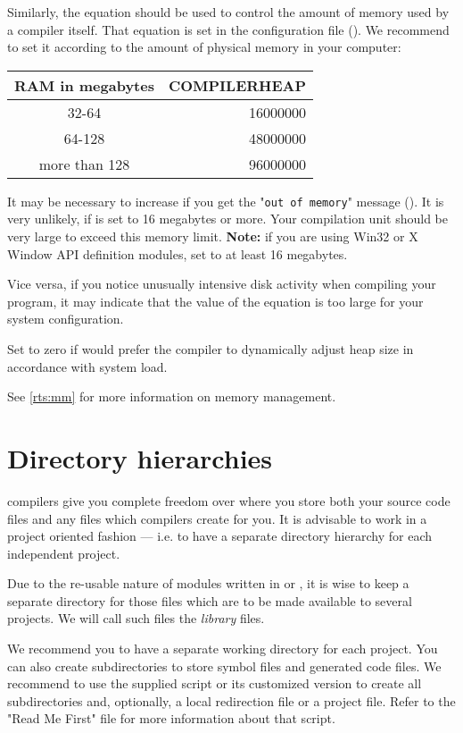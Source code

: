 Similarly, the equation 
should be used to control the amount of memory used by a compiler
itself. That equation is set in the configuration file ({\tt \cfg{}}).
We recommend to set it according to the
amount of physical memory in your computer:
\begin{flushleft}
\begin{tabular}{cr}
RAM in megabytes & COMPILERHEAP \\
\hline
32-64         &   16000000   \\
64-128        &   48000000   \\
more than 128 &   96000000
\end{tabular}
\end{flushleft}
It may be necessary to increase  if you get
the "\verb'out of memory'" message ().
It is very unlikely, if  is set to 16 megabytes or more.
Your compilation unit should be very large to exceed this memory limit.
{\bf Note:} if you are using Win32 or X Window API definition modules,
set  to at least 16 megabytes.

Vice versa, if you notice unusually intensive disk
activity when compiling your program, it may indicate that the
value of the  equation is too large for your
system configuration.

Set  to zero if would prefer the compiler to
dynamically adjust heap size in accordance with system load.

See \ref{rts:mm} for more information on \XDS{} memory management.

\section{Directory hierarchies}

\xds{} compilers give you complete freedom over where you store both your source
code files and any files which compilers create for you. It
is advisable to work in a project oriented fashion --- i.e. to have a separate
directory hierarchy for each independent project.

Due to the re-usable nature of modules written in \mt{} or \ot{},
it is wise to keep a separate directory for those files which are to  be
made available to several projects. We will call such files the {\em  library}
files.

We recommend you to have a separate working directory for each project.
You can also create subdirectories to store symbol files and
generated code files. We recommend to use the supplied script
or its customized version to create all subdirectories and,
optionally, a local redirection file or a project file. Refer to the
"Read Me First" file for more information about that script.

